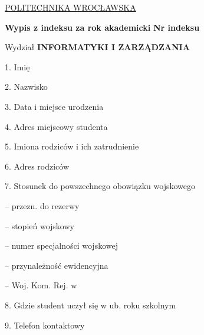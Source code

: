 \documentclass[10pt]{report}
\begin{document}
\begin{minipage}[b]{0.2\linewidth}
\small{\underline{POLITECHNIKA WROCŁAWSKA}}
\newline
{}
\end{minipage}
\begin{minipage}[b]{0.79\linewidth}
\huge{\textbf{Wypis z indeksu za rok akademicki %
}}
\large{\textbf{Nr indeksu %
}}
\end{minipage}

\vspace{0.5cm}

\begin{minipage}[b]{0.5\linewidth}
\begin{normalsize}
Wydział \textbf{INFORMATYKI I ZARZĄDZANIA}

1. Imię %

2. Nazwisko %

3. Data i miejsce urodzenia %

4. Adres miejscowy studenta %

5. Imiona rodziców i ich zatrudnienie %

6. Adres rodziców %
\end{normalsize}
\end{minipage}
\hspace{0.04\linewidth}
\begin{minipage}[b]{0.45\linewidth}
\begin{normalsize}
7.  Stosunek do powszechnego obowiązku wojskowego

  -- przezn. do rezerwy
  
  -- stopień wojskowy %
  
  -- numer specjalności wojskowej %
  
  -- przynależność ewidencyjna %

  -- Woj. Kom. Rej. w %

8. Gdzie student uczył się w ub. roku szkolnym %

9. Telefon kontaktowy %

\end{normalsize}
\end{minipage}

\vspace{2cm}
\end{document}
